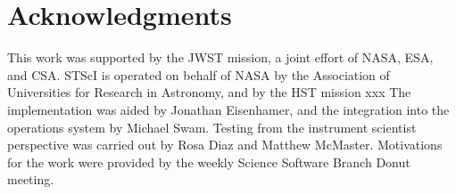 \documentclass[final,authoryear,5p,times,twocolumn]{elsarticle}
\begin{document}
\section{Acknowledgments}

This work was supported by the JWST mission, a joint effort of NASA,
ESA, and CSA. STScI is operated on behalf of NASA by the Association
of Universities for Research in Astronomy, and by the HST mission xxx
The implementation was aided by
Jonathan Eisenhamer, and the integration into the operations system by Michael
Swam. Testing from the instrument scientist perspective was carried out by Rosa
Diaz and Matthew McMaster. Motivations for the work were provided by the weekly
Science Software Branch Donut meeting.



\end{document}
